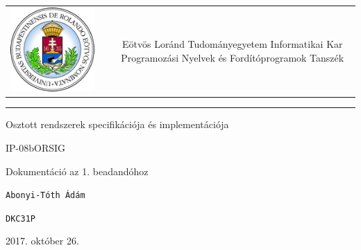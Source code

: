 \documentclass[12pt]{article}
\begin{document}
	
	

\begin{titlepage}
	\vspace*{0cm}
	\centering
	\begin{tabular}{cp{1cm}c}
		\begin{minipage}{4cm}
			\vspace{0pt}
			\includegraphics[width=1\textwidth]{elte_cimer}
		\end{minipage} & &
		\begin{minipage}{7cm}
			\vspace{0pt}Eötvös Loránd Tudományegyetem \vspace{10pt} \newline
			Informatikai Kar \vspace{10pt} \newline
			Programozási Nyelvek és Fordítóprogramok Tanszék
		\end{minipage}
	\end{tabular}
	
	\vspace*{0.2cm}
	\rule{\textwidth}{1pt}
	
	\vspace*{3cm}
	{\Huge Osztott rendszerek specifikációja és implementációja }
	
	\vspace*{0.5cm}
	{\normalsize IP-08bORSIG}
	
	\vspace{2cm}
	{\huge Dokumentáció az 1. beadandóhoz}
	
	\vspace*{5cm}
	
	{\large \verb|Abonyi-Tóth Ádám| } %
	
	{\large \verb|DKC31P| }  %
		
	
	\vfill
	
	\vspace*{1cm}
	2017. október 26. %
\end{titlepage}
\end{document}
